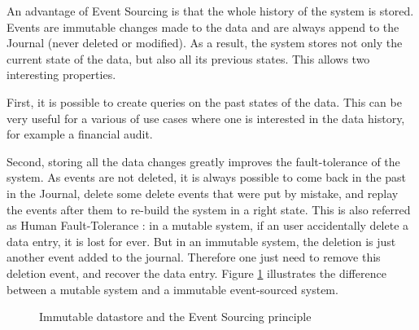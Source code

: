 An advantage of Event Sourcing is that the whole history of the system is stored. Events are immutable changes made to the data
and are always append to the Journal (never deleted or modified). As a result, the system stores not only the current state
of the data, but also all its previous states. This allows two interesting properties.

First, it is possible to create queries on the past states of the data. This can be very useful for a various of use cases
where one is interested in the data history, for example a financial audit.

Second, storing all the data changes greatly improves the fault-tolerance of the system. As events are not deleted, it is always possible 
to come back in the past in the Journal, delete some delete events that were put by mistake, and replay the events after
them to re-build the system in a right state. This is also referred as Human Fault-Tolerance : in a mutable system,
if an user accidentally delete a data entry, it is lost for ever. But in an immutable system, the deletion is just another
event added to the journal. Therefore one just need to remove this deletion event, and recover the data entry. Figure \ref{fig:event-sourcing}
illustrates the difference between a mutable system and a immutable event-sourced system.
\\ 
\begin{figure}[h]
  \begin{center}
    \caption{Immutable datastore and the Event Sourcing principle}
    \label{fig:event-sourcing}
  \end{center}
\end{figure}

